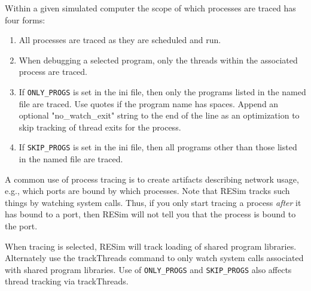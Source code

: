 \documentclass[titlepage]{article}
\begin{document}
Within a given simulated computer the scope of which processes are traced has four forms:
\begin{enumerate}
\item All processes are traced as they are scheduled and run.
\item When debugging a selected program, only the threads within the associated process are traced.
\item If {\tt ONLY\_PROGS} is set in the ini file, then only the programs listed in the named file are traced.  Use quotes if the program name has
spaces.  Append an optional "no\_watch\_exit" string to the end of the line as an optimization to skip tracking of thread exits for the process.
\item If {\tt SKIP\_PROGS} is set in the ini file, then all programs other than those listed in the named file are traced.
\end{enumerate}

A common use of process tracing is to create artifacts describing network usage, e.g., which ports are bound by which processes.  Note that RESim tracks
such things by watching system calls.  Thus, if you only start tracing a process \textit{after} it has bound to a port, then RESim will not tell you that
the process is bound to the port.

When tracing is selected, RESim will track loading of shared program libraries.  Alternately use the trackThreads command to only watch system calls associated
with shared program libraries.
Use of {\tt ONLY\_PROGS} and {\tt SKIP\_PROGS} also affects thread tracking via trackThreads.
\end{document}
